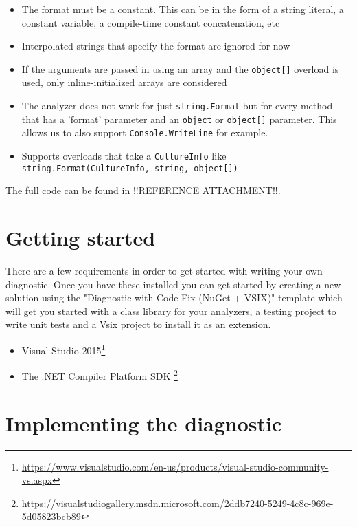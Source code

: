 \begin{itemize}
\item The format must be a constant. This can be in the form of a string literal, a constant variable, a compile-time constant concatenation, etc
\item Interpolated strings that specify the format are ignored for now
\item If the arguments are passed in using an array and the \texttt{object[]} overload is used, only inline-initialized arrays are considered
\item The analyzer does not work for just \texttt{string.Format} but for every method that has a 'format' parameter and an \texttt{object} or \texttt{object[]} parameter. This allows us to also support \texttt{Console.WriteLine} for example.
\item Supports overloads that take a \texttt{CultureInfo} like \texttt{string.Format(CultureInfo, string, object[])}
\end{itemize}

The full code can be found in !!REFERENCE ATTACHMENT!!.


\section{Getting started}
\label{sec:diagnostic-getting-started}

There are a few requirements in order to get started with writing your own diagnostic. Once you have these installed you can get started by creating a new solution using the "Diagnostic with Code Fix (NuGet + VSIX)" template which will get you started with a class library for your analyzers, a testing project to write unit tests and a Vsix project to install it as an extension.

\begin{itemize}
\item Visual Studio 2015\footnote{\url{https://www.visualstudio.com/en-us/products/visual-studio-community-vs.aspx}}
\item The .NET Compiler Platform SDK \footnote{\url{https://visualstudiogallery.msdn.microsoft.com/2ddb7240-5249-4c8c-969e-5d05823bcb89}}
\end{itemize}

\section{Implementing the diagnostic}
\label{sec:diagnostic-implementing}

